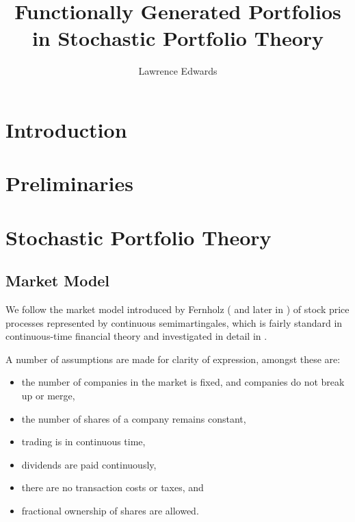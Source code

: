 \documentclass[british]{amsart}
\numberwithin{equation}{section}
\numberwithin{figure}{section}
\theoremstyle{plain}
\theoremstyle{definition}
\theoremstyle{plain}
\theoremstyle{plain}
\theoremstyle{plain}
\theoremstyle{remark}
\theoremstyle{plain}
\begin{document}
\title{Functionally Generated Portfolios in Stochastic Portfolio Theory}
\author{Lawrence Edwards}
\maketitle

\newpage

\tableofcontents{}

\newpage

\section{Introduction}

\newpage

\section{Preliminaries}

\newpage

\section{Stochastic Portfolio Theory}

\subsection{Market Model}

We follow the market model introduced by Fernholz (\cite{fernholz1999pgf} and later in \cite{fernholz2009}) of stock price processes represented by continuous semimartingales, which is fairly standard in continuous-time financial theory and investigated in detail in \cite{karatzas1998}.

A number of assumptions are made for clarity of expression, amongst these are:
\begin{itemize}
	\item the number of companies in the market is fixed, and companies do not break up or merge,
	\item the number of shares of a company remains constant,
	\item trading is in continuous time,
	\item dividends are paid continuously,
	\item there are no transaction costs or taxes, and
	\item fractional ownership of shares are allowed.
\end{itemize}
\end{document}
